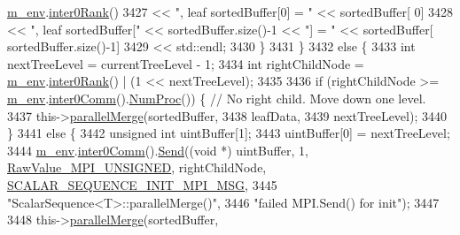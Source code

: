 \begin{DoxyCode}
      \hyperlink{class_q_u_e_s_o_1_1_scalar_sequence_a71618cd6351b29361b437af68447a4c8}{m\_env}.\hyperlink{class_q_u_e_s_o_1_1_base_environment_ae106b5bb8a80b655b88b3a26b1e7c185}{inter0Rank}()
3427                               << \textcolor{stringliteral}{", leaf sortedBuffer[0] = "}                               << sortedBuffer[
      0]
3428                               << \textcolor{stringliteral}{", leaf sortedBuffer["} << sortedBuffer.size()-1 << \textcolor{stringliteral}{"] = "} << sortedBuffer[
      sortedBuffer.size()-1]
3429                               << std::endl;
3430     \}
3431   \}
3432   \textcolor{keywordflow}{else} \{
3433     \textcolor{keywordtype}{int} nextTreeLevel  = currentTreeLevel - 1;
3434     \textcolor{keywordtype}{int} rightChildNode = \hyperlink{class_q_u_e_s_o_1_1_scalar_sequence_a71618cd6351b29361b437af68447a4c8}{m\_env}.\hyperlink{class_q_u_e_s_o_1_1_base_environment_ae106b5bb8a80b655b88b3a26b1e7c185}{inter0Rank}() | (1 << nextTreeLevel);
3435 
3436     \textcolor{keywordflow}{if} (rightChildNode >= \hyperlink{class_q_u_e_s_o_1_1_scalar_sequence_a71618cd6351b29361b437af68447a4c8}{m\_env}.\hyperlink{class_q_u_e_s_o_1_1_base_environment_a689e4d140c74d495d97eb498714a4b82}{inter0Comm}().\hyperlink{class_q_u_e_s_o_1_1_mpi_comm_aa780721ae0fdeabc5a15e04cb0cad964}{NumProc}()) \{ \textcolor{comment}{// No right child. Move
       down one level.}
3437       this->\hyperlink{class_q_u_e_s_o_1_1_scalar_sequence_aedb57153660cf539fc0ca3737a1c4f7b}{parallelMerge}(sortedBuffer,
3438                           leafData,
3439                           nextTreeLevel);
3440     \}
3441     \textcolor{keywordflow}{else} \{
3442       \textcolor{keywordtype}{unsigned} \textcolor{keywordtype}{int} uintBuffer[1];
3443       uintBuffer[0] = nextTreeLevel;
3444       \hyperlink{class_q_u_e_s_o_1_1_scalar_sequence_a71618cd6351b29361b437af68447a4c8}{m\_env}.\hyperlink{class_q_u_e_s_o_1_1_base_environment_a689e4d140c74d495d97eb498714a4b82}{inter0Comm}().\hyperlink{class_q_u_e_s_o_1_1_mpi_comm_a1ecdbeac992a2ab1ff12e45e0c1b53b4}{Send}((\textcolor{keywordtype}{void} *) uintBuffer, 1, 
      \hyperlink{_mpi_comm_8h_a06cbfbc33436f6e0dc8a48ff3c49bdfc}{RawValue\_MPI\_UNSIGNED}, rightChildNode, 
      \hyperlink{_scalar_sequence_8h_a64aad2676a8b0db9e73a3dfb2d3cf0a0}{SCALAR\_SEQUENCE\_INIT\_MPI\_MSG},
3445                               \textcolor{stringliteral}{"ScalarSequence<T>::parallelMerge()"},
3446                               \textcolor{stringliteral}{"failed MPI.Send() for init"});
3447 
3448       this->\hyperlink{class_q_u_e_s_o_1_1_scalar_sequence_aedb57153660cf539fc0ca3737a1c4f7b}{parallelMerge}(sortedBuffer,

\end{DoxyCode}
